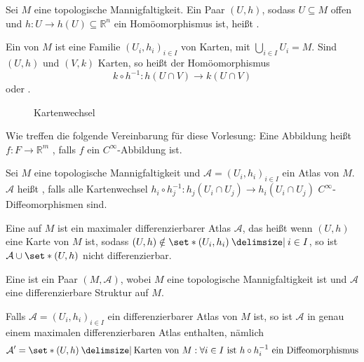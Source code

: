 \begin{definition}[{name=[{Karte, Atlas, Kartenwechsel}]}]
	Sei $M$ eine topologische Mannigfaltigkeit.
	Ein Paar $(U,h)$, sodass $U \subseteq M$ offen und $h \colon U \to h(U) \subseteq \mathbb{R}^n$ ein Homöomorphismus ist, heißt .
	
	Ein  von $M$ ist eine Familie $(U_i,h_i)_{i \in I}$ von Karten, mit $\bigcup_{i \in I} U_i = M$.
	Sind $(U,h)$ und $(V,k)$ Karten, so heißt der Homöomorphismus 
	\[
		k \circ h^{-1} \colon h(U \cap V) \longrightarrow k(U \cap V)
	\]
	 oder .  
\end{definition}

\begin{figure}
	\Centering
	\caption{Kartenwechsel}
\end{figure}

Wie treffen die folgende Vereinbarung für diese Vorlesung: Eine Abbildung heißt $f \colon F \to \mathbb{R}^m$ , falls $f$ ein $C^\infty$-Abbildung ist.

\begin{definition}[{name=[differenzierbare Struktur]}]
	Sei $M$ eine topologische Mannigfaltigkeit und $\mathcal{A} = (U_i,h_i)_{i \in I}$ ein Atlas von $M$.
	$\mathcal{A}$ heißt , falls alle Kartenwechsel $h_i \circ h_j^{-1} \colon h_j(U_i \cap U_j) \to h_i(U_i \cap U_j)$  $C^\infty$-Diffeomorphismen sind.
	
	Eine  auf $M$ ist ein maximaler differenzierbarer Atlas $\mathcal{A}$, das heißt wenn $(U,h)$ eine Karte von $M$ ist, sodass $(U,h) \notin \set*{(U_i,h_i) \given i \in I}$, so ist $\mathcal{A} \cup \set*{(U,h)}$ nicht differenzierbar.
	
	Eine  ist ein Paar $(M,\mathcal{A})$, wobei $M$ eine topologische Mannigfaltigkeit ist und $\mathcal{A}$ eine differenzierbare Struktur auf $M$.
\end{definition}

\begin{bemerkung}[{name=[jeder Atlas ist in einem maximalen enthalten]}]
	Falls $\mathcal{A}= (U_i,h_i)_{i \in I}$ ein differenzierbarer Atlas von $M$ ist, so ist $\mathcal{A}$ in genau einem maximalen differenzierbaren Atlas enthalten, nämlich 
	\[
		\mathcal{A}' = \set*{(U,h) \given \text{Karten von }M : \forall i \in I  \text{ ist } h \circ  h_i^{-1} \text{ ein Diffeomorphismus}}
	\]
\end{bemerkung}

